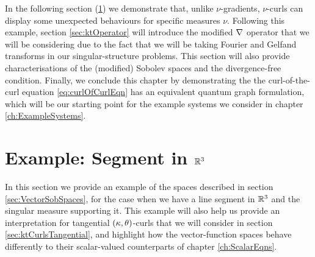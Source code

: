 In the following section (\ref{sec:CurlExamples}) we demonstrate that, unlike $\nu$-gradients, $\nu$-curls can display some unexpected behaviours for specific measures $\nu$.
Following this example, section \ref{sec:ktOperator} will introduce the modified $\nabla$ operator that we will be considering due to the fact that we will be taking Fourier and Gelfand transforms in our singular-structure problems.
This section will also provide characterisations of the (modified) Sobolev spaces and the divergence-free condition.
Finally, we conclude this chapter by demonstrating the the curl-of-the-curl equation \eqref{eq:curlOfCurlEqn} has an equivalent quantum graph formulation, which will be our starting point for the example systems we consider in chapter \ref{ch:ExampleSystems}.

\section{Example: Segment in $\mathbb{R}^3$} \label{sec:CurlExamples}
In this section we provide an example of the spaces described in section \ref{sec:VectorSobSpaces}, for the case when we have a line segment in $\mathbb{R}^3$ and the singular measure supporting it. 
This example will also help us provide an interpretation for tangential $\left( \kappa, \theta \right)$-curls that we will consider in section \ref{sec:ktCurlsTangential}, and highlight how the vector-function spaces behave differently to their scalar-valued counterparts of chapter \ref{ch:ScalarEqns}. \newline

